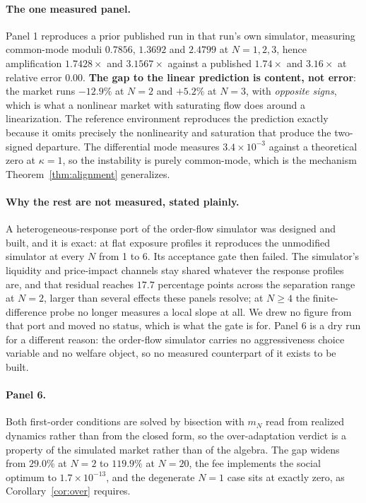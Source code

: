 \documentclass{article}
\theoremstyle{plain}
\theoremstyle{definition}
\newcommand{\mN}{m_N}
\begin{document}
\paragraph{The one measured panel.}
Panel 1 reproduces a prior published run in that run's own simulator, measuring common-mode moduli $0.7856$, $1.3692$ and $2.4799$ at $N=1,2,3$, hence amplification $1.7428\times$ and $3.1567\times$ against a published $1.74\times$ and $3.16\times$ at relative error $0.00$. \textbf{The gap to the linear prediction is content, not error}: the market runs $-12.9\%$ at $N=2$ and $+5.2\%$ at $N=3$, with \emph{opposite signs}, which is what a nonlinear market with saturating flow does around a linearization. The reference environment reproduces the prediction exactly because it omits precisely the nonlinearity and saturation that produce the two-signed departure. The differential mode measures $3.4\times 10^{-3}$ against a theoretical zero at $\kappa=1$, so the instability is purely common-mode, which is the mechanism Theorem~\ref{thm:alignment} generalizes.

\paragraph{Why the rest are not measured, stated plainly.}
A heterogeneous-response port of the order-flow simulator was designed and built, and it is exact: at flat exposure profiles it reproduces the unmodified simulator at every $N$ from 1 to 6. Its acceptance gate then failed. The simulator's liquidity and price-impact channels stay shared whatever the response profiles are, and that residual reaches $17.7$ percentage points across the separation range at $N=2$, larger than several effects these panels resolve; at $N \geq 4$ the finite-difference probe no longer measures a local slope at all. We drew no figure from that port and moved no status, which is what the gate is for. Panel 6 is a dry run for a different reason: the order-flow simulator carries no aggressiveness choice variable and no welfare object, so no measured counterpart of it exists to be built.

\paragraph{Panel 6.}
Both first-order conditions are solved by bisection with $\mN$ read from realized dynamics rather than from the closed form, so the over-adaptation verdict is a property of the simulated market rather than of the algebra. The gap widens from $29.0\%$ at $N=2$ to $119.9\%$ at $N=20$, the fee implements the social optimum to $1.7\times 10^{-13}$, and the degenerate $N=1$ case sits at exactly zero, as Corollary~\ref{cor:over} requires.
\end{document}
